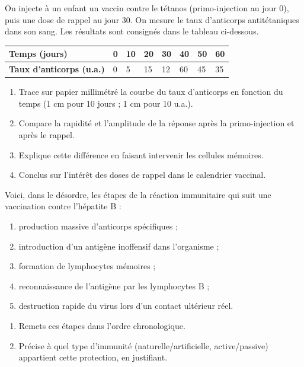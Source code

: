 \documentclass[11pt]{article}
\begin{document}
\begin{exercice}
On injecte à un enfant un vaccin contre le tétanos (primo-injection au jour 0), puis une dose de rappel au jour 30. On mesure le taux d'anticorps antitétaniques dans son sang. Les résultats sont consignés dans le tableau ci-dessous.
\begin{center}
\begin{tabularx}{\linewidth}{|l|X|X|X|X|X|X|X|}
\hline
\rowcolor{popblueL} \textbf{Temps (jours)} & 0 & 10 & 20 & 30 & 40 & 50 & 60 \\
\hline
\textbf{Taux d'anticorps (u.a.)} & 0 & 5 & 15 & 12 & 60 & 45 & 35 \\
\hline
\end{tabularx}
\end{center}
\begin{enumerate}
\item Trace sur papier millimétré la courbe du taux d'anticorps en fonction du temps (1 cm pour 10 jours ; 1 cm pour 10 u.a.).
\item Compare la rapidité et l'amplitude de la réponse après la primo-injection et après le rappel.
\item Explique cette différence en faisant intervenir les cellules mémoires.
\item Conclus sur l'intérêt des doses de rappel dans le calendrier vaccinal.
\end{enumerate}
\end{exercice}

\begin{exercice}
Voici, dans le désordre, les étapes de la réaction immunitaire qui suit une vaccination contre l'hépatite B :
\begin{enumerate}
\item[a.] production massive d'anticorps spécifiques ;
\item[b.] introduction d'un antigène inoffensif dans l'organisme ;
\item[c.] formation de lymphocytes mémoires ;
\item[d.] reconnaissance de l'antigène par les lymphocytes B ;
\item[e.] destruction rapide du virus lors d'un contact ultérieur réel.
\end{enumerate}
\begin{enumerate}
\item Remets ces étapes dans l'ordre chronologique.
\item Précise à quel type d'immunité (naturelle/artificielle, active/passive) appartient cette protection, en justifiant.
\end{enumerate}
\end{exercice}
\end{document}
